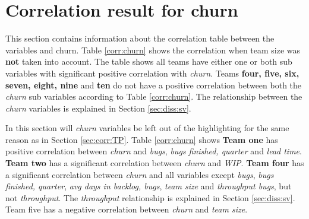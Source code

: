 \documentclass[UKenglish]{ifimaster}  %
\begin{document}
 
\section{Correlation result for churn}
\label{sec:corr:churn}
This section contains information about the correlation table between the variables and churn. Table \ref{corr:churn} shows the correlation  when team size was \textbf{not} taken into account. The table shows all teams have either one or both sub variables with significant positive correlation with \textit{churn}. Teams \textbf{four, five, six, seven, eight, nine} and \textbf{ten} do not have a positive correlation between both the \textit{churn} sub variables according to Table \ref{corr:churn}. The relationship between the \textit{churn} variables is explained in Section \ref{sec:diss:sv}. 

In this section will \textit{churn} variables be left out of the highlighting for the same reason as in Section \ref{sec:corr:TP}.
Table \ref{corr:churn} shows \textbf{Team one} has positive correlation between \textit{churn} and \textit{bugs}, \textit{bugs finished, quarter} and \textit{lead time}. \textbf{Team two} has a significant correlation between \textit{churn} and  \textit{WIP}. \textbf{Team four} has a significant correlation between \textit{churn} and  all variables except \textit{bugs}, \textit{bugs finished, quarter}, \textit{avg days in backlog, bugs}, \textit{team size} and \textit{throughput bugs}, but not \textit{throughput}. The \textit{throughput} relationship is explained in Section \ref{sec:diss:sv}. {Team five} has a negative correlation between \textit{churn} and  \textit{team size}. 
\end{document}
